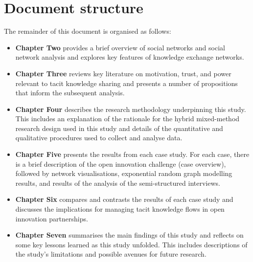 \section{Document structure}

The remainder of this document is organised as follows:

\begin{itemize}[leftmargin=0pt]
    \item[] \textbf{Chapter Two} provides a brief overview of social networks and social network analysis and explores key features of knowledge exchange networks.
    \item[] \textbf{Chapter Three} reviews key literature on motivation, trust, and power relevant to tacit knowledge sharing and presents a number of propositions that inform the subsequent analysis.
    \item[] \textbf{Chapter Four} describes the research methodology underpinning this study. This includes an explanation of the rationale for the hybrid mixed\hyp{}method research design used in this study and details of the quantitative and qualitative procedures used to collect and analyse data.
    \item[] \textbf{Chapter Five} presents the results from each case study. For each case, there is a brief description of the open innovation challenge (case overview), followed by network visualisations, exponential random graph modelling results, and results of the analysis of the semi-structured interviews.
    \item[] \textbf{Chapter Six} compares and contrasts the results of each case study and discusses the implications for managing tacit knowledge flows in open innovation partnerships. 
    \item[] \textbf{Chapter Seven} summarises the main findings of this study and reflects on some key lessons learned as this study unfolded. This includes descriptions of the study's limitations and possible avenues for future research. 
\end{itemize}





